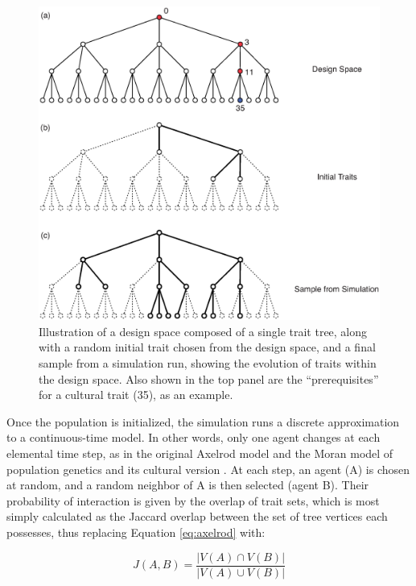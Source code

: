 \begin{figure}[htbp] 
\centering 
\includegraphics[scale=0.5]{graphics/semanticaxelrod/design-init-final.eps} 
\caption{Illustration of a design space composed of a single trait tree, along with a random initial trait chosen from the design space, and a final sample from a simulation run, showing the evolution of traits within the design space.  Also shown in the top panel are the ``prerequisites'' for a cultural trait (35), as an example.} 
\label{img:prereq} 
\end{figure}

Once the population is initialized, the simulation runs a discrete
approximation to a continuous-time model. In other words, only one agent
changes at each elemental time step, as in the original Axelrod model
and the Moran model of population genetics and its cultural version
\citep{aoki2011rates, moran1962statistical, moran1958random}. At each
step, an agent (A) is chosen at random, and a random neighbor of A is
then selected (agent B). Their probability of interaction is given by
the overlap of trait sets, which is most simply calculated as the
Jaccard overlap between the set of tree vertices each possesses, thus
replacing Equation \ref{eq:axelrod} with:

\begin{equation}J(A,B) = \frac{|V(A) \cap V(B)|}{|V(A) \cup V(B)|}\end{equation}


